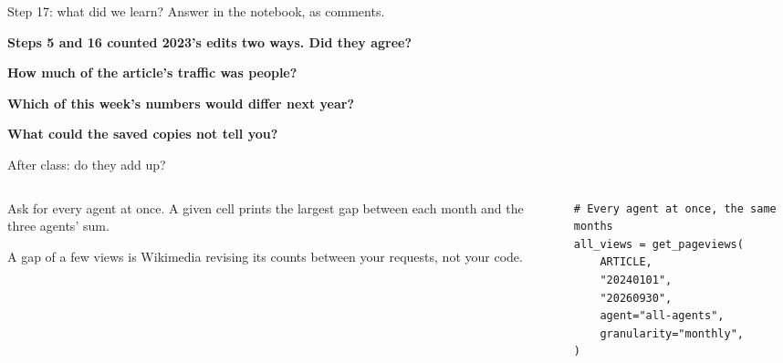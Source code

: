 \documentclass[9pt,aspectratio=169]{beamer}
\begin{document}
\begin{frame}{Step 17: what did we learn?}
    Answer in the notebook, as comments.

    \medskip
    \textbf{Steps 5 and 16 counted 2023's edits two ways. Did they agree?}

    \medskip
    \textbf{How much of the article's traffic was people?}

    \medskip
    \textbf{Which of this week's numbers would differ next year?}

    \medskip
    \textbf{What could the saved copies not tell you?}
\end{frame}


\begin{frame}[fragile]{After class: do they add up?}
    \begin{columns}[T]
        \begin{column}{0.37\textwidth}
            Ask for every agent at once. A given cell prints the largest gap between each month and the three agents' sum.

            \medskip
            A gap of a few views is Wikimedia revising its counts between your requests, not your code.
        \end{column}
        \begin{column}{0.6\textwidth}
\begin{lstlisting}
# Every agent at once, the same months
all_views = get_pageviews(
    ARTICLE,
    "20240101",
    "20260930",
    agent="all-agents",
    granularity="monthly",
)
\end{lstlisting}
        \end{column}
    \end{columns}
\end{frame}
\end{document}

